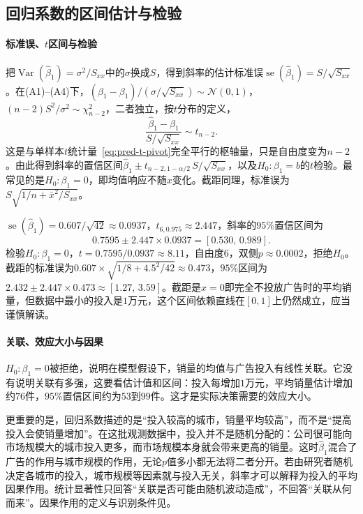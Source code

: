 \subsection{回归系数的区间估计与检验}

\paragraph{标准误、$t$区间与检验}

把$\operatorname{Var}(\hat\beta_1)=\sigma^2/S_{xx}$中的$\sigma$换成$S$，得到斜率的估计标准误$\operatorname{se}(\hat\beta_1)=S/\sqrt{S_{xx}}$。在(A1)--(A4)下，$(\hat\beta_1-\beta_1)/(\sigma/\sqrt{S_{xx}})\sim\mathcal N(0,1)$，$(n-2)S^2/\sigma^2\sim\chi^2_{n-2}$，二者独立，按$t$分布的定义，
\begin{equation}
 \frac{\hat\beta_1-\beta_1}{S/\sqrt{S_{xx}}}\sim t_{n-2}.
 \label{eq:pred-slope-t}
\end{equation}
这是与单样本$t$统计量~\eqref{eq:pred-t-pivot}完全平行的枢轴量，只是自由度变为$n-2$。由此得到斜率的置信区间$\hat\beta_1\pm t_{n-2,1-\alpha/2}\,S/\sqrt{S_{xx}}$，以及$H_0:\beta_1=b$的$t$检验。最常见的是$H_0:\beta_1=0$，即均值响应不随$x$变化。截距同理，标准误为$S\sqrt{1/n+\bar x^2/S_{xx}}$。

\begin{example}[广告数据的斜率推断]
\label{ex:pred-ad-slope}
$\operatorname{se}(\hat\beta_1)=0.607/\sqrt{42}\approx0.0937$，$t_{6,0.975}\approx2.447$，斜率的$95\%$置信区间为
\[
 0.7595\pm2.447\times0.0937=[0.530,\,0.989].
\]
检验$H_0:\beta_1=0$，$t=0.7595/0.0937\approx8.11$，自由度$6$，双侧$p\approx0.0002$，拒绝$H_0$。截距的标准误为$0.607\times\sqrt{1/8+4.5^2/42}\approx0.473$，$95\%$区间为$2.432\pm2.447\times0.473\approx[1.27,\,3.59]$。截距是$x=0$即完全不投放广告时的平均销量，但数据中最小的投入是$1$万元，这个区间依赖直线在$[0,1]$上仍然成立，应当谨慎解读。
\end{example}

\paragraph{关联、效应大小与因果}

$H_0:\beta_1=0$被拒绝，说明在模型假设下，销量的均值与广告投入有线性关联。它没有说明关联有多强，这要看估计值和区间：投入每增加$1$万元，平均销量估计增加约$76$件，$95\%$置信区间约为$53$到$99$件。这才是实际决策需要的效应大小。

更重要的是，回归系数描述的是“投入较高的城市，销量平均较高”，而不是“提高投入会使销量增加”。在这批观测数据中，投入并不是随机分配的：公司很可能向市场规模大的城市投入更多，而市场规模本身就会带来更高的销量。这时$\hat\beta_1$混合了广告的作用与城市规模的作用，无论$p$值多小都无法将二者分开。若由研究者随机决定各城市的投入，城市规模等因素就与投入无关，斜率才可以解释为投入的平均因果作用。统计显著性只回答“关联是否可能由随机波动造成”，不回答“关联从何而来”。因果作用的定义与识别条件见。

